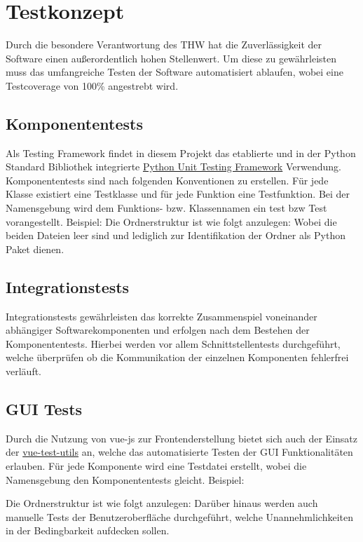 \section{Testkonzept}
Durch die besondere Verantwortung des THW hat die Zuverlässigkeit der Software einen außerordentlich hohen Stellenwert. Um diese zu gewährleisten muss das umfangreiche Testen der Software automatisiert ablaufen, wobei eine Testcoverage von 100\% angestrebt wird.
\subsection{Komponententests}
Als Testing Framework findet in diesem Projekt das etablierte und in der Python Standard Bibliothek integrierte \href{https://docs.python.org/3/library/unittest.html}{Python Unit Testing Framework} Verwendung. Komponententests sind nach folgenden Konventionen zu erstellen. Für jede Klasse existiert eine Testklasse und für jede Funktion eine Testfunktion. Bei der Namensgebung wird dem Funktions- bzw. Klassennamen ein test bzw Test vorangestellt. Beispiel:
Die Ordnerstruktur ist wie folgt anzulegen:
 Wobei die beiden \pythoninit Dateien leer sind und lediglich zur Identifikation der Ordner als Python Paket dienen.
\subsection{Integrationstests} 
Integrationstests gewährleisten das korrekte Zusammenspiel voneinander abhängiger Softwarekomponenten und erfolgen nach dem Bestehen der Komponententests. Hierbei werden vor allem Schnittstellentests durchgeführt, welche überprüfen ob die Kommunikation der einzelnen Komponenten fehlerfrei verläuft.
\subsection{GUI Tests}
Durch die Nutzung von vue-js zur Frontenderstellung bietet sich auch der Einsatz der \href{https://vue-test-utils.vuejs.org/en/}{vue-test-utils} an, welche das automatisierte Testen der GUI Funktionalitäten erlauben. Für jede Komponente wird eine Testdatei erstellt, wobei die Namensgebung den Komponententests gleicht. Beispiel:

Die Ordnerstruktur ist wie folgt anzulegen:
Darüber hinaus werden auch manuelle Tests der Benutzeroberfläche durchgeführt, welche Unannehmlichkeiten in der Bedingbarkeit aufdecken sollen.